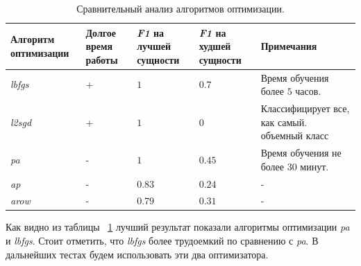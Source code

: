 \documentclass{csmathnotes}
\begin{document}
\begin{table}[!h]
    \begin{center}
        \begin{tabular}{|p{2cm}|p{1.6cm}|p{1.5cm}|p{1.5cm}|p{2.5cm}|}
            \hline
            Алгоритм оптимизации &  Долгое время работы & \emph{F1} на лучшей сущности & \emph{F1} на худшей сущности & Примечания \\
            \hline
            \emph{lbfgs} & + & $1$ & $0.7$ & Время обучения более $5$ часов.  \\
            \hline
            \emph{l2sgd} & + & $1$  & $0$ & Классифицирует все, как самый. объемный класс \\
            \hline
            \emph{pa} & - & $1$  & $0.45$ & Время обучения не более $30$ минут. \\
            \hline
            \emph{ap} & - & $0.83$ & $0.24$  & - \\
            \hline
            \emph{arow} & - & $0.79$ & $0.31$  & - \\
            \hline
        \end{tabular}
    \end{center}
    \caption{\label{tabl:table1}Сравнительный анализ алгоритмов оптимизации.}
\end{table}

Как видно из таблицы ~\ref{tabl:table1} лучший результат показали алгоритмы оптимизации \emph{pa} и \emph{lbfgs}. Стоит отметить, что \emph{lbfgs}  более трудоемкий по сравнению с \emph{pa}. В дальнейших тестах будем использовать эти два оптимизатора.
\end{document}
